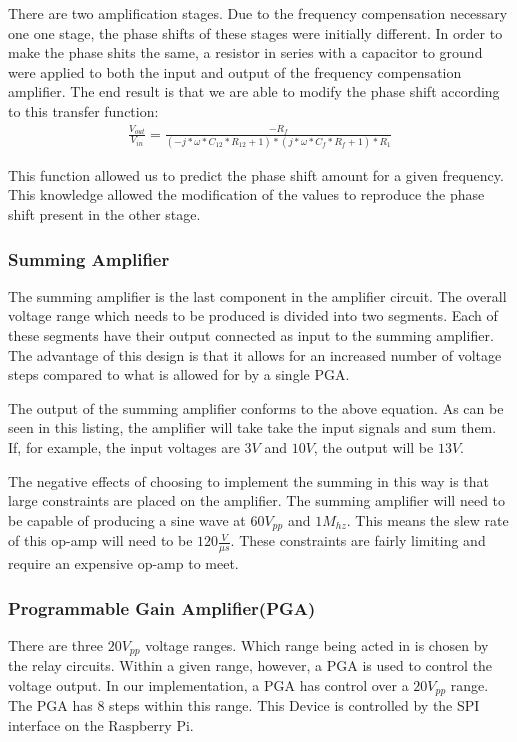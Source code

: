 \documentclass{article}	%
\begin{document}
\begin{multicols}{2}
There are two amplification stages.
Due to the frequency compensation necessary one one stage,
the phase shifts of these stages were initially different.
In order to make the phase shits the same,
a resistor in series with a capacitor to ground were applied
to both the input and output of the frequency compensation amplifier.
The end result is that we are able to modify the phase shift according
to this transfer function:
\begin{gather*}
\frac{V_{out}}{V_{in}} = \frac{-R_f}{(-j * \omega * C_{12} * R_{12} + 1)*(j * \omega * C_f * R_f + 1)*R_1}
\end{gather*}

This function allowed us to predict the phase shift amount for a given frequency.
This knowledge allowed the modification of the values to reproduce the
phase shift present in the other stage.

\subsubsection{Summing Amplifier}
The summing amplifier is the last component
in the amplifier circuit.
The overall voltage range which needs to be produced is divided into two segments.
Each of these segments have their output connected as
input to the summing amplifier.
The advantage of this design is that
it allows for an increased number of voltage steps
compared to what is allowed for by a single PGA.

The output of the summing amplifier conforms to
the above equation.
As can be seen in this listing,
the amplifier will take take the input signals
and sum them.
If, for example, 
the input voltages are $3V$ and $10V$, the
output will be $13V$.

The negative effects of choosing to 
implement the summing in this way is
that large constraints are placed on the amplifier.
The summing amplifier will need to be capable
of producing a sine wave at $60V_{pp}$ and $1M_{hz}$.
This means the slew rate of this op-amp will need to be
$120 \frac{V}{\mu s}$.
These constraints are fairly limiting and require
an expensive op-amp to meet.

\subsubsection{Programmable Gain Amplifier(PGA)}
There are three $20V_{pp}$ voltage ranges.
Which range being acted in is chosen by the relay circuits.
Within a given range,
however,
a PGA is used to control the voltage output.
In our implementation,
a PGA has control over a $20V_{pp}$ range.
The PGA has 8 steps within this range.
This Device is controlled by 
the SPI interface on the Raspberry Pi.


\end{multicols}
\end{document}
